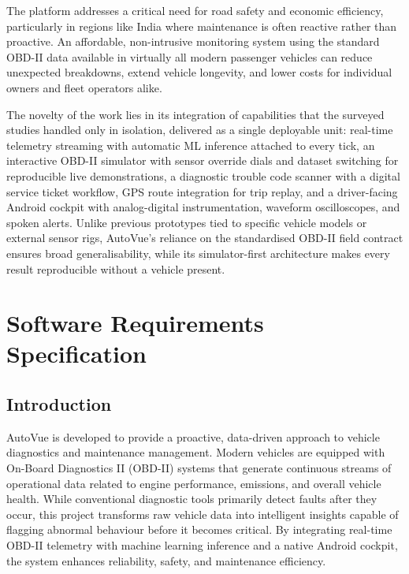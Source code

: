 \documentclass[10pt,a4paper]{report}
\begin{document}
The platform addresses a critical need for road safety and economic efficiency, particularly in regions like India where maintenance is often reactive rather than proactive. An affordable, non-intrusive monitoring system using the standard OBD-II data available in virtually all modern passenger vehicles can reduce unexpected breakdowns, extend vehicle longevity, and lower costs for individual owners and fleet operators alike. \par

The novelty of the work lies in its integration of capabilities that the surveyed studies handled only in isolation, delivered as a single deployable unit: real-time telemetry streaming with automatic ML inference attached to every tick, an interactive OBD-II simulator with sensor override dials and dataset switching for reproducible live demonstrations, a diagnostic trouble code scanner with a digital service ticket workflow, GPS route integration for trip replay, and a driver-facing Android cockpit with analog-digital instrumentation, waveform oscilloscopes, and spoken alerts. Unlike previous prototypes tied to specific vehicle models or external sensor rigs, AutoVue's reliance on the standardised OBD-II field contract ensures broad generalisability, while its simulator-first architecture makes every result reproducible without a vehicle present. \par


\chapter{Software Requirements Specification}
\section{Introduction}

AutoVue is developed to provide a proactive, data-driven approach to vehicle diagnostics and maintenance management. Modern vehicles are equipped with On-Board Diagnostics II (OBD-II) systems that generate continuous streams of operational data related to engine performance, emissions, and overall vehicle health. While conventional diagnostic tools primarily detect faults after they occur, this project transforms raw vehicle data into intelligent insights capable of flagging abnormal behaviour before it becomes critical. By integrating real-time OBD-II telemetry with machine learning inference and a native Android cockpit, the system enhances reliability, safety, and maintenance efficiency. \par
\end{document}
